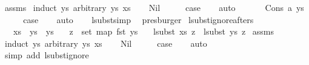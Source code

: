 \begin{isabellebody}
%
\isadelimproof
%
\endisadelimproof
%
\isatagproof
{}\isamarkupfalse%
\ assms\isanewline
{}\isamarkupfalse%
\ {\isacharparenleft}{\kern0pt}induct\ ys{}\ arbitrary{\isacharcolon}{\kern0pt}\ ys{}\ xs{\isacharparenright}{\kern0pt}\isanewline
\ \ \isamarkupfalse%
\ Nil\isanewline
\ \ \isamarkupfalse%
\ \isamarkupfalse%
\ {\isacharquery}{\kern0pt}case\isanewline
\ \ \isamarkupfalse%
\ auto\isanewline
\ \ \isamarkupfalse%
\isanewline
{}\isamarkupfalse%
\isanewline
\ \ \isamarkupfalse%
\ {\isacharparenleft}{\kern0pt}Cons\ a\ ys{}{\isacharparenright}{\kern0pt}\isanewline
\ \ \isamarkupfalse%
\ \isamarkupfalse%
\ {\isacharquery}{\kern0pt}case\isanewline
\ \ \isamarkupfalse%
\ auto\isanewline
\ \ \isamarkupfalse%
\ lsubst{\isacharunderscore}{\kern0pt}simp\ \isamarkupfalse%
\ presburger\isanewline
{}\isamarkupfalse%
%
\endisatagproof
{\isafoldproof}%
%
\isadelimproof
\isanewline
%
\endisadelimproof
\isanewline
{}\isamarkupfalse%
\ lsubst{\isacharunderscore}{\kern0pt}ignore{\isacharunderscore}{\kern0pt}afters{\isacharcolon}{\kern0pt}\isanewline
\ \ \ {\isachardoublequoteopen}xs\ {\isacharequal}{\kern0pt}\ ys{}\ {\isacharat}{\kern0pt}\ ys{}{\isachardoublequoteclose}\isanewline
\ \ \ {\isachardoublequoteopen}z\ {\isasymnotin}\ set\ {\isacharparenleft}{\kern0pt}map\ fst\ ys{}{\isacharparenright}{\kern0pt}{\isachardoublequoteclose}\isanewline
\ \ \ {\isachardoublequoteopen}lsubst\ xs\ z\ {\isacharequal}{\kern0pt}\ lsubst\ ys{}\ z{\isachardoublequoteclose}\isanewline
%
\isadelimproof
%
\endisadelimproof
%
\isatagproof
{}\isamarkupfalse%
\ assms\isanewline
{}\isamarkupfalse%
\ {\isacharparenleft}{\kern0pt}induct\ ys{}\ arbitrary{\isacharcolon}{\kern0pt}\ ys{}\ xs{\isacharparenright}{\kern0pt}\isanewline
\ \ \isamarkupfalse%
\ Nil\isanewline
\ \ \isamarkupfalse%
\ \isamarkupfalse%
\ {\isacharquery}{\kern0pt}case\isanewline
\ \ \isamarkupfalse%
\ auto\isanewline
\ \ \isamarkupfalse%
\ {\isacharparenleft}{\kern0pt}simp\ add{\isacharcolon}{\kern0pt}\ lsubst{\isacharunderscore}{\kern0pt}ignore{\isacharparenright}{\kern0pt}\isanewline

\end{isabellebody}
